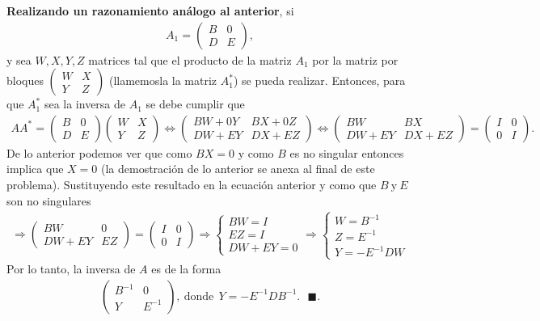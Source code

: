 \documentclass[11pt,letterpaper]{article}
\newcommand{\finf}{\blacksquare.}
\begin{document}
\begin{enumerate}
\textbf{Realizando un razonamiento análogo al anterior}, si 
\begin{align*}
A_1=\begin{pmatrix}
B&0\\
D&E
\end{pmatrix},
\end{align*}
 y sea $W,X,Y,Z$ matrices tal que el producto de la matriz $A_1$ por la matriz por bloques $
\begin{pmatrix}
W & X\\
Y & Z
\end{pmatrix}
$ (llamemosla la matriz $A_1^*$) se pueda realizar. Entonces, para que $A_1^*$ sea la inversa de $A_1$ se debe cumplir que 
\begin{align*}
AA^{*}=\begin{pmatrix}
B & 0 \\
D & E
\end{pmatrix}\begin{pmatrix}
W & X\\
Y & Z
\end{pmatrix}\Leftrightarrow \begin{pmatrix}
BW+0Y & BX+0Z\\
DW+EY & DX+EZ
\end{pmatrix}\Leftrightarrow \begin{pmatrix}
BW & BX\\
DW+EY & DX+EZ
\end{pmatrix}=\begin{pmatrix}
I&0\\
0&I
\end{pmatrix}.
\end{align*}
De lo anterior podemos ver que como $BX=0$ y como $B$ es no singular entonces implica que $X=0$ (la demostración de lo anterior se anexa al final de este problema). Sustituyendo este resultado en la ecuación anterior y como que $B\ \text{y} \ E$ son no singulares
\begin{align*}
\Rightarrow \begin{pmatrix}
BW & 0\\
DW+EY & EZ
\end{pmatrix}=\begin{pmatrix}
I&0\\
0&I
\end{pmatrix}\Rightarrow\left\{\begin{array}{c}
BW=I\\
EZ=I\\
DW+EY=0
\end{array} \right. \Rightarrow 
\left\{\begin{array}{c}
W=B^{-1}\\
Z=E^{-1}\\
Y=-E^{-1}DW
\end{array} \right.
\end{align*}
Por lo tanto, la inversa de $A$ es de la forma
\begin{align*}
\begin{pmatrix}
B^{-1} & 0\\
Y& E^{-1}
\end{pmatrix}, \ \text{donde}\ \  Y=-E^{-1}DB^{-1}.\ \ \ \finf
\end{align*}


\end{enumerate}
\end{document}
